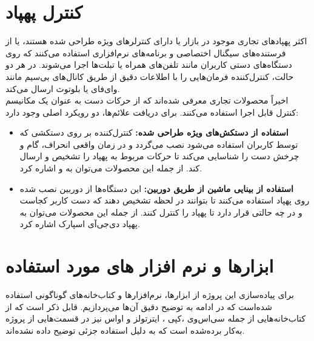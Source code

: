 \section{کنترل پهپاد}
اکثر پهپادهای تجاری موجود در بازار یا دارای کنترلرهای ویژه طراحی شده هستند، یا از فرستنده‌های سیگنال اختصاصی و برنامه‌های نرم‌افزاری استفاده می‌کنند که روی
 دستگاه‌های دستی کاربران مانند تلفن‌های همراه یا تبلت‌ها اجرا می‌شوند. در هر دو حالت، کنترل‌کننده فرمان‌هایی را با اطلاعات دقیق از طریق کانال‌های بی‌سیم مانند وای‌فای یا بلوتوث ارسال می‌کند. 
\\
اخیراً محصولات تجاری معرفی شده‌اند که از حرکات دست به عنوان یک مکانیسم کنترل قابل اجرا استفاده می‌کنند. برای دریافت علائم‌ها، دو رویکرد اصلی وجود دارد:
\begin{itemize}
    \item \textbf{استفاده از دستکش‌های ویژه طراحی شده:} کنترل‌کننده بر روی دستکشی که توسط کاربران استفاده می‌شود نصب می‌گردد و در زمان واقعی انحراف، گام و چرخش دست را شناسایی می‌کند تا حرکات مربوط به پهپاد را تشخیص و ارسال کند. از جمله این محصولات می‌توان به  و  اشاره کرد.
    \item \textbf{استفاده از بینایی ماشین از طریق دوربین:}   این دستگاه‌ها از دوربین نصب شده روی پهپاد استفاده می‌کنند تا بتوانند در لحظه تشخیص دهند که دست کاربر کجاست و در چه حالتی قرار دارد تا پهپاد را کنترل کنند. از جمله این محصولات می‌توان به پهپاد دی‌جی‌آی اسپارک  اشاره کرد.
\end{itemize}


\section{ابزار‌ها و نرم افزار های مورد استفاده}
برای پیاده‌سازی این پروژه از ابزار‌ها، نرم‌افزار‌ها و کتاب‌خانه‌های گوناگونی استفاده شده‌است که در ادامه به توضیح دقیق آن‌ها می‌پردازیم. قابل ذکر است که از کتاب‌خانه‌هایی از جمله سی‌اس‌وی ،کپی ، ایترتولز و اواس نیز در قسمت‌هایی از پروژه به‌کار برده‌شده است که به دلیل استفاده جزئی توضیح داده نشده‌اند.



